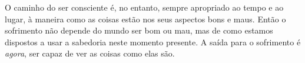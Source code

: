O caminho do ser consciente é, no entanto, sempre apropriado ao tempo e ao
lugar, à maneira como as coisas estão nos seus aspectos bons e maus. Então o
sofrimento não depende do mundo ser bom ou mau, mas de como estamos dispostos a
usar a sabedoria neste momento presente. A saída para o sofrimento é
\emph{agora}, ser capaz de ver as coisas como elas são.

